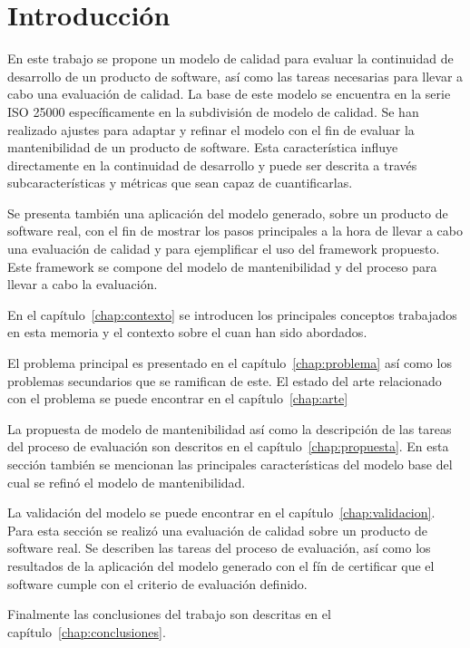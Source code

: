 \chapter{Introducción}
En este trabajo se propone un modelo de calidad para evaluar la continuidad
de desarrollo de un producto de software, así como las tareas necesarias
para llevar a cabo una evaluación de calidad.
La base de este modelo se encuentra en la serie ISO 25000
específicamente en la subdivisión de modelo de calidad.
Se han realizado ajustes para adaptar y refinar el modelo con el fin de evaluar la mantenibilidad de un producto de software.
Esta característica influye directamente en la continuidad de desarrollo y puede
ser descrita a través subcaracterísticas y métricas que sean capaz de cuantificarlas.

Se presenta también una aplicación del modelo generado, sobre un producto de software
real, con el fin de mostrar los pasos principales a la hora de llevar a cabo
una evaluación de calidad y para ejemplificar el uso del framework propuesto. Este framework se compone
del modelo de mantenibilidad y del proceso para llevar a cabo la evaluación.

En el capítulo~\ref{chap:contexto} se introducen los principales conceptos trabajados
en esta memoria y el contexto sobre el cuan han sido abordados.

El problema principal es presentado en el capítulo~\ref{chap:problema} así como
los problemas secundarios que se ramifican de este. El estado del arte relacionado
con el problema se puede encontrar en el capítulo~\ref{chap:arte}

La propuesta de modelo de mantenibilidad así como la descripción de las tareas del proceso
de evaluación son descritos en el capítulo~\ref{chap:propuesta}. En esta sección
también se mencionan las principales características del modelo base del cual
se refinó el modelo de mantenibilidad.

La validación del modelo se puede encontrar en el capítulo~\ref{chap:validacion}.
Para esta sección se realizó una evaluación de calidad sobre un producto de software
real. Se describen las tareas del proceso de evaluación, así como los resultados
de la aplicación del modelo generado con el fín de certificar que el software
cumple con el criterio de evaluación definido.

Finalmente las conclusiones del trabajo son descritas en el capítulo~\ref{chap:conclusiones}.
